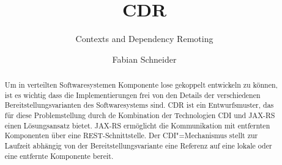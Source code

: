 \documentclass[german,a4paper]{llncs}
\begin{document}
\title{CDR}															%
\subtitle{Contexts and Dependency Remoting}							%
\author{Fabian Schneider}					    						%
           
\maketitle

\begin{acronym}
\end{acronym}

\begin{abstract}
Um in verteilten Softwaresystemen Komponente lose gekoppelt entwickeln zu können, ist es wichtig dass die Implementierungen frei von den Details der verschiedenen Bereitstellungsvarianten des Softwaresystems sind. 
\ac{CDR} ist ein Entwurfsmuster, das für diese Problemstellung durch de Kombination der Technologien \ac{CDI} und \ac{JAX-RS} einen Lösungsansatz bietet. 
\ac{JAX-RS} ermöglicht die Kommunikation mit entfernten Komponenten über eine \ac{REST}-Schnittstelle. 
Der \ac{CDI}"=Mechanismus stellt zur Laufzeit abhängig von der Bereitstellungsvariante eine Referenz auf eine lokale oder eine entfernte Komponente bereit.
\end{abstract}










%

\end{document}
